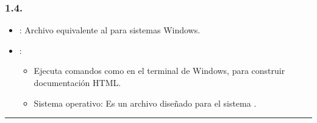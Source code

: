 \documentclass[a4paper,10pt,spanish]{sphinxmanual}
\begin{document}
\subsubsection{1.4. }
\label{\detokenize{configuracion_inicial/004.estructura_inicial_proyecto:archivo-make-bat}}\begin{itemize}
\item {} 
\sphinxAtStartPar
{}: Archivo equivalente al  para sistemas Windows.

\item {} 
\sphinxAtStartPar
{}:
\begin{itemize}
\item {} 
\sphinxAtStartPar
Ejecuta comandos como  en el terminal de Windows, para construir documentación HTML.

\item {} 
\sphinxAtStartPar
Sistema operativo: Es un archivo diseñado para el sistema .

\end{itemize}

\end{itemize}


\bigskip\hrule\bigskip
\end{document}
